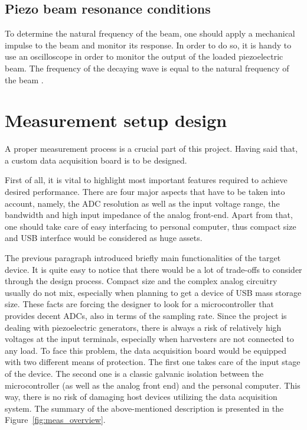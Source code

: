 \documentclass[12pt,a4paper]{article}
\begin{document}
\subsection{Piezo beam resonance conditions}

To determine the natural frequency of the beam, one should apply a mechanical impulse to the beam and monitor its response. In order to do so, it is handy to use an oscilloscope in order to monitor the output of the loaded piezoelectric beam. The frequency of the decaying wave is equal to the natural frequency of the beam \cite{PPA}.
\par

\section{Measurement setup design}

A proper measurement process is a crucial part of this project. Having said that, a custom data acquisition board is to be designed. 
\par

First of all, it is vital to highlight most important features required to achieve desired performance. There are four major aspects that have to be taken into account, namely, the ADC resolution as well as the input voltage range, the bandwidth and high input impedance of the analog front-end. Apart from that, one should take care of easy interfacing to personal computer, thus compact size and USB interface would be considered as huge assets.
\par
The previous paragraph introduced briefly main functionalities of the target device. It is quite easy to notice that there would be a lot of trade-offs to consider through the design process. Compact size and the complex analog circuitry usually do not mix, especially when planning to get a device of USB mass storage size. These facts are forcing the designer to look for a microcontroller that provides decent ADCs, also in terms of the sampling rate. Since the project is dealing with piezoelectric generators, there is always a risk of relatively high voltages at the input terminals, especially when harvesters are not connected to any load. To face this problem, the data acquisition board would be equipped with two different means of protection. The first one takes care of the input stage of the device. The second one is a classic galvanic isolation between the microcontroller (as well as the analog front end) and the personal computer. This way, there is no risk of damaging host devices utilizing the data acquisition system. The summary of the above-mentioned description is presented in the Figure~\ref{fig:meas_overview}.\par
\end{document}
